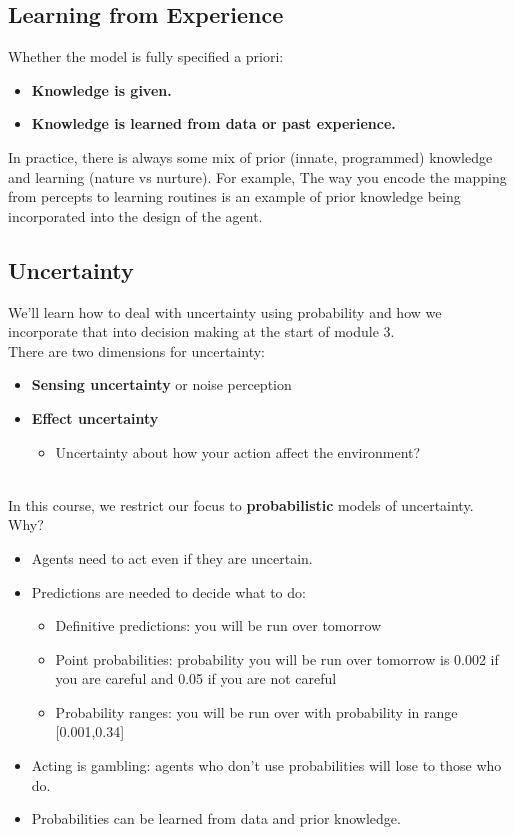 \documentclass[12pt]{article}
\begin{document}
\subsection{Learning from Experience}
Whether the model is fully specified a priori:

\begin{itemize}
    \item \textbf{Knowledge is given.}
    \item \textbf{Knowledge is learned from data or past experience.}
\end{itemize}

\noindent In practice, there is always some mix of prior (innate, programmed) knowledge and learning (nature vs nurture). For example, The way you encode the mapping from percepts to learning routines is an example of prior knowledge being incorporated into the design of the agent. 

\subsection{Uncertainty}
We'll learn how to deal with uncertainty using probability and how we incorporate that into decision making at the start of module 3.\\
\noindent There are two dimensions for uncertainty:

\begin{itemize}
    \item \textbf{Sensing uncertainty} or noise perception
    \item \textbf{Effect uncertainty}
    \begin{itemize}
        \item Uncertainty about how your action affect the environment? 
    \end{itemize}
\end{itemize}\\

In this course, we restrict our focus to \textbf{probabilistic} models of uncertainty. Why?

\begin{itemize}
    \item Agents need to act even if they are uncertain.
    \item Predictions are needed to decide what to do:
    \begin{itemize}
        \item Definitive predictions: you will be run over tomorrow
        \item Point probabilities: probability you will be run over tomorrow is 0.002 if you are careful and
0.05 if you are not careful
        \item Probability ranges: you will be run over with probability in range [0.001,0.34]
    \end{itemize}
    \item Acting is gambling: agents who don’t use probabilities will lose to those who do.
    \item Probabilities can be learned from data and prior knowledge.
\end{itemize}
\end{document}
